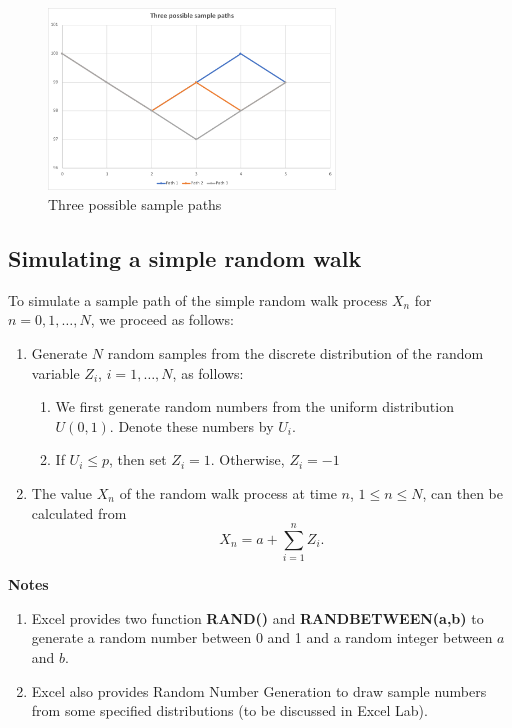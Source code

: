\documentclass[
]{book}
\theoremstyle{definition}
\theoremstyle{definition}
\theoremstyle{definition}
\theoremstyle{definition}
\theoremstyle{remark}
\begin{document}
\begin{figure}
\hypertarget{fig:SamplePaths}{%
\centering
\includegraphics[width=3in,height=\textheight]{RWThreePaths.pdf}
\caption{Three possible sample paths}\label{fig:SamplePaths}
}
\end{figure}

\hypertarget{simulating-a-simple-random-walk}{%
\subsection{Simulating a simple random walk}\label{simulating-a-simple-random-walk}}

To simulate a sample path of the simple random walk process \(X_n\) for
\(n = 0,1, \ldots, N\), we proceed as follows:

\begin{enumerate}
\def\labelenumi{\arabic{enumi}.}
\item
  Generate \(N\) random samples from the discrete distribution of the
  random variable \(Z_i\), \(i = 1,\ldots, N\), as follows:

  \begin{enumerate}
  \def\labelenumii{\arabic{enumii}.}
  \item
    We first generate random numbers from the uniform distribution
    \(U(0,1)\). Denote these numbers by \(U_i\).
  \item
    If \(U_i \le p\), then set \(Z_i = 1\). Otherwise, \(Z_i = -1\)
  \end{enumerate}
\item
  The value \(X_n\) of the random walk process at time \(n\),
  \(1 \le n \le N\), can then be calculated from
  \[X_n = a + \sum_{i=1}^n  Z_i.\]
\end{enumerate}

\textbf{Notes}

\begin{enumerate}
\def\labelenumi{\arabic{enumi}.}
\item
  Excel provides two function \textbf{RAND()} and \textbf{RANDBETWEEN(a,b)} to
  generate a random number between 0 and 1 and a random integer
  between \(a\) and \(b\).
\item
  Excel also provides Random Number Generation to draw sample numbers
  from some specified distributions (to be discussed in Excel Lab).
\end{enumerate}
\end{document}
